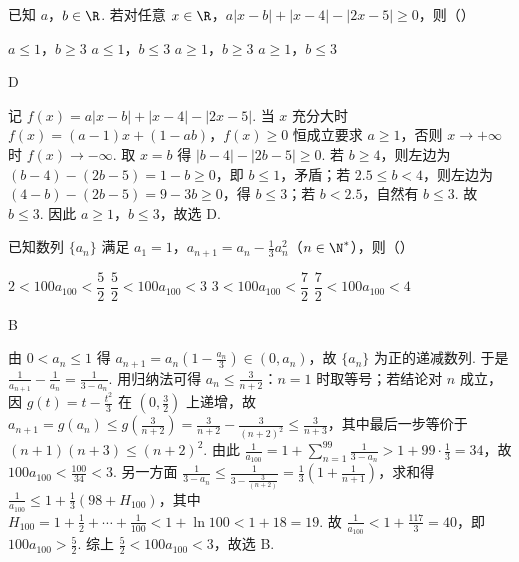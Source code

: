 \begin{problem}
已知 \(a\)，\(b\in\R\). 若对任意 \(x\in\R\)，\(a|x-b|+|x-4|-|2x-5|\ge 0\)，则（\quad）

\choices
    {\(a\le 1\)，\(b\ge 3\)}
    {\(a\le 1\)，\(b\le 3\)}
    {\(a\ge 1\)，\(b\ge 3\)}
    {\(a\ge 1\)，\(b\le 3\)}
\end{problem}

\begin{answer}
D
\end{answer}

\begin{solution}
记 \(f(x)=a|x-b|+|x-4|-|2x-5|\). 当 \(x\) 充分大时 \(f(x)=(a-1)x+(1-ab)\)，\(f(x)\ge0\) 恒成立要求 \(a\ge1\)，否则 \(x\to+\infty\) 时 \(f(x)\to-\infty\). 取 \(x=b\) 得 \(|b-4|-|2b-5|\ge0\). 若 \(b\ge4\)，则左边为 \((b-4)-(2b-5)=1-b\ge0\)，即 \(b\le1\)，矛盾；若 \(2.5\le b<4\)，则左边为 \((4-b)-(2b-5)=9-3b\ge0\)，得 \(b\le3\)；若 \(b<2.5\)，自然有 \(b\le3\). 故 \(b\le3\). 因此 \(a\ge1\)，\(b\le3\)，故选 D.
\end{solution}

\begin{problem}
已知数列 \(\{a_n\}\) 满足 \(a_1=1\)，\(a_{n+1}=a_n-\frac13a_n^2\)（\(n\in\N^*\)），则（\quad）

\choices
    {\(2<100a_{100}<\dfrac52\)}
    {\(\dfrac52<100a_{100}<3\)}
    {\(3<100a_{100}<\dfrac72\)}
    {\(\dfrac72<100a_{100}<4\)}
\end{problem}

\begin{answer}
B
\end{answer}

\begin{solution}
由 \(0<a_n\le1\) 得 \(a_{n+1}=a_n\left(1-\frac{a_n}3\right)\in(0,a_n)\)，故 \(\{a_n\}\) 为正的递减数列. 于是 \(\frac1{a_{n+1}}-\frac1{a_n}=\frac1{3-a_n}\). 用归纳法可得 \(a_n\le\frac3{n+2}\)：\(n=1\) 时取等号；若结论对 \(n\) 成立，因 \(g(t)=t-\frac{t^2}3\) 在 \((0,\frac32)\) 上递增，故 \(a_{n+1}=g(a_n)\le g\left(\frac3{n+2}\right)=\frac3{n+2}-\frac3{(n+2)^2}\le\frac3{n+3}\)，其中最后一步等价于 \((n+1)(n+3)\le(n+2)^2\). 由此 \(\frac1{a_{100}}=1+\sum_{n=1}^{99}\frac1{3-a_n}>1+99\cdot\frac13=34\)，故 \(100a_{100}<\frac{100}{34}<3\). 另一方面 \(\frac1{3-a_n}\le\frac1{3-\frac{3}{(n+2)}}=\frac13\left(1+\frac1{n+1}\right)\)，求和得 \(\frac1{a_{100}}\le1+\frac13(98+H_{100})\)，其中 \(H_{100}=1+\frac12+\cdots+\frac1{100}<1+\ln100<1+18=19\). 故 \(\frac1{a_{100}}<1+\frac{117}3=40\)，即 \(100a_{100}>\frac52\). 综上 \(\frac52<100a_{100}<3\)，故选 B.
\end{solution}

